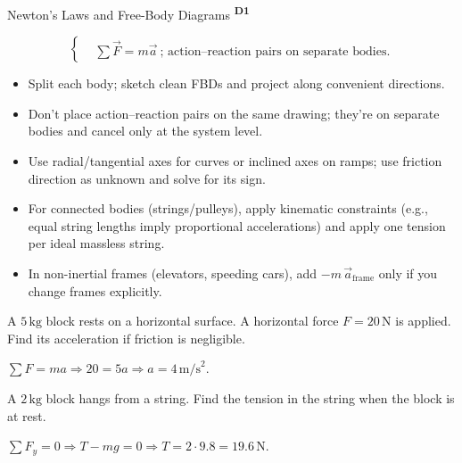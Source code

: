 ﻿\documentclass[12pt,a4paper]{article}
\providecommand{\KPFormulas}{}
\providecommand{\KPHeuristics}{}
\providecommand{\KPProblems}{}
\newcommand{\DOne}{\texorpdfstring{\textsuperscript{\textbf{D1}}}{ D1}}
\begin{document}
\begin{KnowledgePoint}{Newton's Laws and Free-Body Diagrams \DOne}
  \KPFormulas
  \begin{formulabox}
  \[
  \left\{\begin{aligned}
    &\sum \vec F=m\vec a\ \text{; action--reaction pairs on separate bodies}.
  \end{aligned}\right.
  \]
  \end{formulabox}

  \KPHeuristics
  \begin{heuristicsbox}
  \begin{itemize}[leftmargin=*]
    \item Split each body; sketch clean FBDs and project along convenient directions.
    \item Don't place action--reaction pairs on the same drawing; they're on separate bodies and cancel only at the system level.
    \item Use radial/tangential axes for curves or inclined axes on ramps; use friction direction as unknown and solve for its sign.
    \item For connected bodies (strings/pulleys), apply kinematic constraints (e.g., equal string lengths imply proportional accelerations) and apply one tension per ideal massless string.
    \item In non-inertial frames (elevators, speeding cars), add $-m\,\vec a_{\text{frame}}$ only if you change frames explicitly.
  \end{itemize}
  \end{heuristicsbox}

  \KPProblems
\begin{cheatproblem}
  A $5\,\text{kg}$ block rests on a horizontal surface. A horizontal force $F=20\,\text{N}$ is applied. Find its acceleration if friction is negligible.
\begin{solutionbox}
  $\sum F=ma\Rightarrow 20=5a\Rightarrow a=4\,\text{m/s}^2$.
\end{solutionbox}
\end{cheatproblem}
\begin{cheatproblem}
  A $2\,\text{kg}$ block hangs from a string. Find the tension in the string when the block is at rest.
\begin{solutionbox}
  $\sum F_y=0\Rightarrow T-mg=0\Rightarrow T=2\cdot9.8=19.6\,\text{N}$.
\end{solutionbox}
\end{cheatproblem}
\end{KnowledgePoint}
\end{document}
